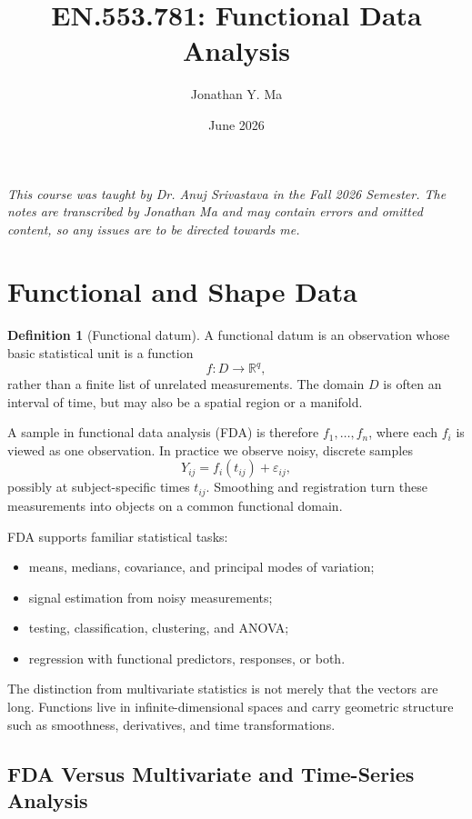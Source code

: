 \documentclass[12pt,oneside]{book}
\title{EN.553.781: Functional Data Analysis}
\author{Jonathan Y. Ma}
\date{June 2026}
\numberwithin{equation}{section}
\theoremstyle{definition}
\newtheorem{definition}{Definition}[section]
\theoremstyle{plain}
\theoremstyle{remark}
\newcommand{\R}{\mathbb{R}}
\begin{document}
\maketitle

\noindent \emph{This course was taught by Dr. Anuj Srivastava in the Fall 2026 Semester. The notes are transcribed by Jonathan Ma and may contain errors and omitted content, so any issues are to be directed towards me.}

\tableofcontents

\section{Functional and Shape Data}

\begin{definition}[Functional datum]
A functional datum is an observation whose basic statistical unit is a
function
\[
    f:D\longrightarrow\R^q,
\]
rather than a finite list of unrelated measurements. The domain $D$ is often
an interval of time, but may also be a spatial region or a manifold.
\end{definition}

A sample in functional data analysis (FDA) is therefore
$f_1,\ldots,f_n$, where each $f_i$ is viewed as one observation. In practice
we observe noisy, discrete samples
\[
    Y_{ij}=f_i(t_{ij})+\varepsilon_{ij},
\]
possibly at subject-specific times $t_{ij}$. Smoothing and registration turn
these measurements into objects on a common functional domain.

FDA supports familiar statistical tasks:
\begin{itemize}
    \item means, medians, covariance, and principal modes of variation;
    \item signal estimation from noisy measurements;
    \item testing, classification, clustering, and ANOVA;
    \item regression with functional predictors, responses, or both.
\end{itemize}
The distinction from multivariate statistics is not merely that the vectors
are long. Functions live in infinite-dimensional spaces and carry geometric
structure such as smoothness, derivatives, and time transformations.

\subsection{FDA Versus Multivariate and Time-Series Analysis}
\end{document}

